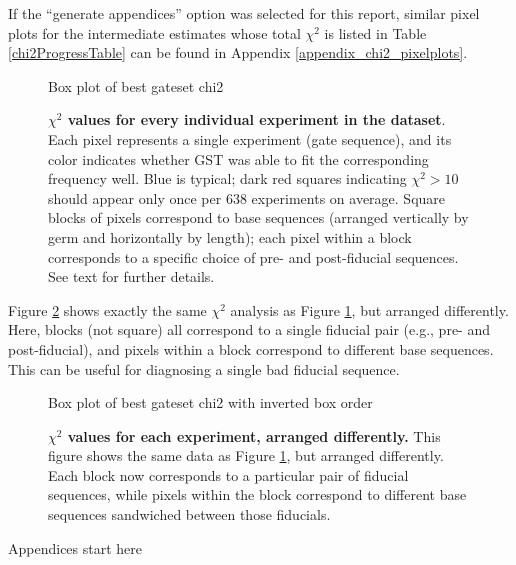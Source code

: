 \documentclass{article}[11pt]
\newcommand{\putfield}[2]{#2}
\begin{document}
{If the ``generate appendices'' option was selected for this report, similar pixel plots for the intermediate estimates whose total $\chi^2$ is listed in Table \ref{chi2ProgressTable} can be found in Appendix \ref{appendix_chi2_pixelplots}.

\begin{figure}
\begin{center}
\putfield{bestGatesetChi2BoxPlot}{Box plot of best gateset chi2}
\caption{\textbf{$\chi^2$ values for every individual experiment in the dataset}.  Each pixel represents a single experiment (gate sequence), and its color indicates whether GST was able to fit the corresponding frequency well.  Blue is typical; dark red squares indicating $\chi^2>10$ should appear only once per 638 experiments on average.  Square blocks of pixels correspond to base sequences (arranged vertically by germ and horizontally by length); each pixel within a block corresponds to a specific choice of pre- and post-fiducial sequences.  See text for further details.\label{bestGatesetChi2BoxPlot}}
\end{center}
\end{figure}

Figure \ref{bestGatesetChi2InvBoxPlot} shows exactly the same $\chi^2$ analysis as Figure \ref{bestGatesetChi2BoxPlot}, but arranged differently.  Here, blocks (not square) all correspond to a single fiducial pair (e.g., pre- and post-fiducial), and pixels within a block correspond to different base sequences.  This can be useful for diagnosing a single bad fiducial sequence.

\begin{figure}
\begin{center}
\putfield{bestGatesetChi2InvBoxPlot}{Box plot of best gateset chi2 with inverted box order}
\caption{\textbf{$\chi^2$ values for each experiment, arranged differently.}  This figure shows the same data as Figure \ref{bestGatesetChi2BoxPlot}, but arranged differently.  Each block now corresponds to a particular pair of fiducial sequences, while pixels within the block correspond to different base sequences sandwiched between those fiducials.\label{bestGatesetChi2InvBoxPlot}}
\end{center}
\end{figure}

}{}

\putfield{appendices}{Appendices start here}
\end{document}
